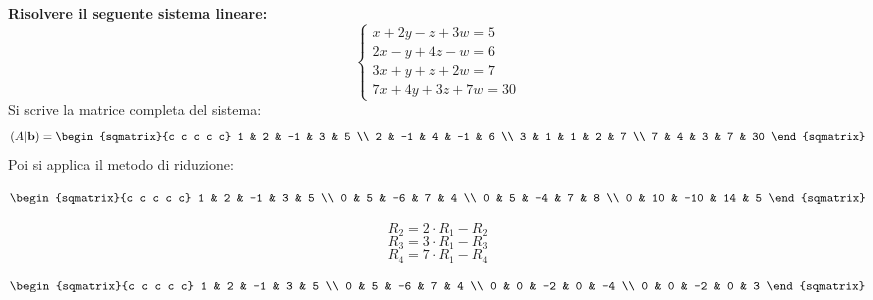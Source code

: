 \begin{esempio}
    \textbf{Risolvere il seguente sistema lineare:}
    \[
        \begin{cases}
            x + 2y - z + 3w = 5 \\
            2x - y + 4z - w = 6 \\
            3x + y + z + 2w = 7 \\
            7x + 4y + 3z + 7w = 30
        \end{cases}
    \]
    Si scrive la matrice completa del sistema:
    \[
        (A|\textbf{b}) =
        \begin{sqmatrix}{c c c c c}
            1 & 2 & -1 & 3 & 5 \\
            2 & -1 & 4 & -1 & 6 \\
            3 & 1 & 1 & 2 & 7 \\
            7 & 4 & 3 & 7 & 30
        \end{sqmatrix}
    \]
    Poi si applica il metodo di riduzione:
    \begin{center}
        \begin{minipage}{.4\textwidth}
            \[
                \begin{sqmatrix}{c c c c c}
                    1 & 2 & -1 & 3 & 5 \\
                    0 & 5 & -6 & 7 & 4 \\
                    0 & 5 & -4 & 7 & 8 \\
                    0 & 10 & -10 & 14 & 5
                \end{sqmatrix}
            \]
        \end{minipage}
        \begin{minipage}{.4\textwidth}
            \[
                R_2 = 2 \cdot R_1 - R_2
            \]
            \[
                R_3 = 3 \cdot R_1 - R_3
            \]
            \[
                R_4 = 7 \cdot R_1 - R_4
            \]
        \end{minipage}
    \end{center}
    \begin{center}
        \begin{minipage}{.4\textwidth}
            \[
                \begin{sqmatrix}{c c c c c}
                    1 & 2 & -1 & 3 & 5 \\
                    0 & 5 & -6 & 7 & 4 \\
                    0 & 0 & -2 & 0 & -4 \\
                    0 & 0 & -2 & 0 & 3

\end{sqmatrix}\]
\end{minipage}
\end{center}
\end{esempio}
